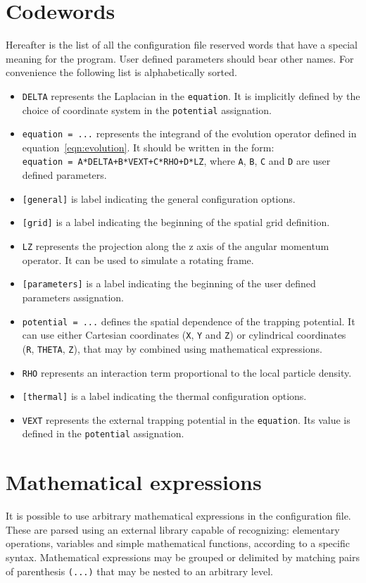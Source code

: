 \documentclass[12pt,a4paper]{report}
\begin{document}
\section{\label{sec:codewords}Codewords}
Hereafter is the list of all the configuration file reserved words that have a special meaning for the program.
User defined parameters should bear other names.
For convenience the following list is alphabetically sorted.
\begin{itemize}
\item \texttt{DELTA} represents the Laplacian in the \texttt{equation}. It is implicitly defined by the choice of coordinate system in the \texttt{potential} assignation.
\item \texttt{equation = ...} represents the integrand of the evolution operator defined in equation~\eqref{eqn:evolution}. It should be written in the form:\\ \texttt{equation = A*DELTA+B*VEXT+C*RHO+D*LZ}, where \texttt{A}, \texttt{B}, \texttt{C} and \texttt{D} are user defined parameters.
\item \texttt{[general]} is label indicating the general configuration options.
\item \texttt{[grid]} is a label indicating the beginning of the spatial grid definition.
\item \texttt{LZ} represents the projection along the z axis of the angular momentum operator. It can be used to simulate a rotating frame. 
\item \texttt{[parameters]} is a label indicating the beginning of the user defined parameters assignation.
\item \texttt{potential = ...} defines the spatial dependence of the trapping potential. It can use either Cartesian coordinates (\texttt{X}, \texttt{Y} and \texttt{Z}) or cylindrical coordinates (\texttt{R}, \texttt{THETA}, \texttt{Z}), that may by combined using mathematical expressions.
\item \texttt{RHO} represents an interaction term proportional to the local particle density.
\item \texttt{[thermal]} is a label indicating the thermal configuration options.
\item \texttt{VEXT} represents the external trapping potential in the \texttt{equation}. Its value is defined in the \texttt{potential} assignation.
\end{itemize}

\section{Mathematical expressions}
It is possible to use arbitrary mathematical expressions in the configuration file.
These are parsed using an external library capable of recognizing: elementary operations, variables and simple mathematical functions, according to a specific syntax.
Mathematical expressions may be grouped or delimited by matching pairs of parenthesis \texttt{(...)} that may be nested to an arbitrary level.
\end{document}
